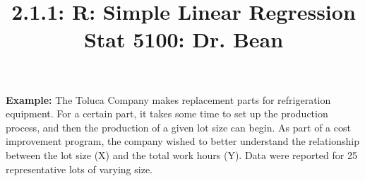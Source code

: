 \documentclass{article}\usepackage[]{graphicx}\usepackage[]{color}
\begin{document}
\title{%
  2.1.1: R: Simple Linear Regression \\
  \smallskip
  \large Stat 5100: Dr. Bean
}
\date{}

\maketitle

\textbf{Example: } The Toluca Company makes replacement parts for refrigeration equipment.  For a certain part, it takes some time to set up the production process, and then the production of a given lot size can begin.  As part of a cost improvement program, the company wished to better understand the relationship between the lot size (X) and the total work hours (Y).  Data were reported for 25 representative lots of varying size.
\end{document}
